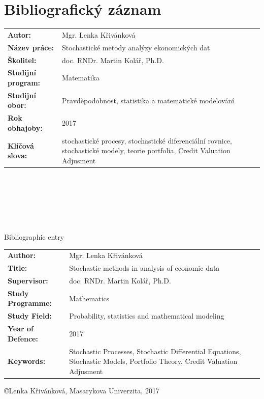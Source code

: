\documentclass[a4paper,12pt]{report}
\theoremstyle{definition} \newtheorem{definice}[veta]{Definice}
\theoremstyle{remark}
\begin{document}
\normalsize



\chapter*{Bibliografický záznam}%
\setcounter{page}{1}

\begin{tabular}{p{3.9cm}  p{9.1cm}}
\textbf{Autor:} & Mgr. Lenka Křivánková \\
\textbf{Název práce:} & Stochastické metody analýzy ekonomických dat \\
\textbf{Školitel:} & doc. RNDr. Martin Kolář, Ph.D.  \\
\textbf{Studijní program:} & Matematika \\
\textbf{Studijní obor:} & Pravděpodobnost, statistika a matematické modelování \\
\textbf{Rok obhajoby:} & 2017 \\
\textbf{Klíčová slova:} & stochastické procesy, stochastické diferenciální rovnice, stochastické modely, teorie portfolia, Credit Valuation Adjusment\\
\end{tabular}
\\\\\\\\\\

\begin{flushright} {{\Huge Bibliographic entry}} \vspace{38pt} \end{flushright}

\hspace{-0.7cm}
\begin{tabular}{p{3.9cm}  p{9.1cm}}
\textbf{Author:} & Mgr. Lenka Křivánková \\
\textbf{Title:} & Stochastic methods in analysis of economic data \\
\textbf{Supervisor:} & doc. RNDr. Martin Kolář, Ph.D.  \\
\textbf{Study Programme:} & Mathematics \\
\textbf{Study Field:} & Probability, statistics and mathematical modeling \\
\textbf{Year of Defence:} & 2017 \\
\textbf{Keywords:} & Stochastic Processes, Stochastic Differential Equations, Stochastic Models, Portfolio Theory, Credit Valuation Adjusment\\
\end{tabular}
\newpage
\pagestyle{empty}
\null
\vfill
\begin{center}
\copyright \quad Lenka Křivánková, Masarykova Univerzita, 2017
\end{center}
\end{document}
